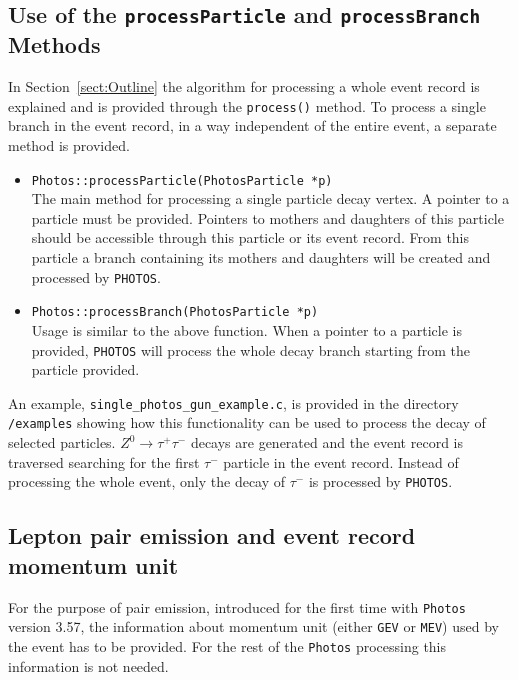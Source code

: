 \documentclass[]{Photos_interface_design}
\begin{document}
\subsection{Use of the {\tt processParticle} and {\tt processBranch} Methods}
\label{PHOTOSgun}

In Section~\ref{sect:Outline} the algorithm for processing a whole
event record is explained and is provided through the {\tt process()}
method.  To process a single branch in the event record, in a way
independent of the entire event, a separate method is provided.

\begin{itemize}
  \item {\tt Photos::processParticle(PhotosParticle *p) } \hfill \\
		The main method for processing a single particle decay vertex. A pointer to a particle must
		be provided. Pointers to mothers and daughters of this particle should be
		accessible through this particle or its event record.
		From this particle a branch containing its mothers and daughters
		will be created and processed by {\tt PHOTOS}.
  \item {\tt Photos::processBranch(PhotosParticle *p) } \hfill \\
		Usage is similar to the above function. When a pointer to a particle is provided,
		{\tt PHOTOS} will process the whole decay branch starting from the particle provided.
\end{itemize}

An example, {\tt single\_photos\_gun\_example.c}, is provided in the directory {\tt /examples}
showing how this functionality can be used to process the decay of selected particles.
$Z^0 \rightarrow \tau^+ \tau^-$ decays are generated and the event record is traversed
searching for the first $\tau^-$ particle in the event record.
Instead of processing the whole event, only the decay of $\tau^-$ is processed by {\tt PHOTOS}.

\subsection{Lepton pair emission and event record momentum unit}
\label{sec:units}



For the purpose of pair emission, introduced for the first time   with {\tt Photos} version
3.57, the information about momentum unit
(either {\tt GEV} or {\tt MEV}) used by the event has to be provided.
For the rest of the {\tt Photos} processing this information is not needed.
\end{document}
